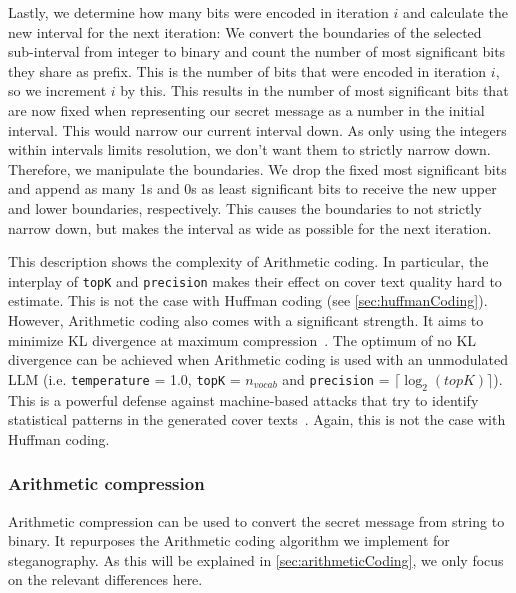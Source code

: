 Lastly, we determine how many bits were encoded in iteration $ i $ and calculate the new interval for the next iteration: We convert the boundaries of the selected sub-interval from integer to binary and count the number of most significant bits they share as prefix. This is the number of bits that were encoded in iteration $ i $, so we increment $ i $ by this. This results in the number of most significant bits that are now fixed when representing our secret message as a number in the initial interval. This would narrow our current interval down. As only using the integers within intervals limits resolution, we don't want them to strictly narrow down. Therefore, we manipulate the boundaries. We drop the fixed most significant bits and append as many 1s and 0s as least significant bits to receive the new upper and lower boundaries, respectively. This causes the boundaries to not strictly narrow down, but makes the interval as wide as possible for the next iteration.

This description shows the complexity of Arithmetic coding. In particular, the interplay of \lstinline|topK| and \lstinline|precision| makes their effect on cover text quality hard to estimate. This is not the case with Huffman coding (see \cref{sec:huffmanCoding}). However, Arithmetic coding also comes with a significant strength. It aims to minimize \gls{KL} divergence at maximum compression~\cite{zieglerNeuralLinguisticSteganography2019}. The optimum of no \gls{KL} divergence can be achieved when Arithmetic coding is used with an unmodulated \gls{LLM} (i.e. \lstinline|temperature| = 1.0, \lstinline|topK| = $n_{vocab}$ and \lstinline|precision| = $ \lceil \log_2(topK) \rceil $). This is a powerful defense against machine-based attacks that try to identify statistical patterns in the generated cover texts~\cite{zieglerNeuralLinguisticSteganography2019}. Again, this is not the case with Huffman coding.

\subsubsection{Arithmetic compression}
\label{sec:arithmeticCompression}
Arithmetic compression can be used to convert the secret message from string to binary. It repurposes the Arithmetic coding algorithm we implement for steganography. As this will be explained in \cref{sec:arithmeticCoding}, we only focus on the relevant differences here.

